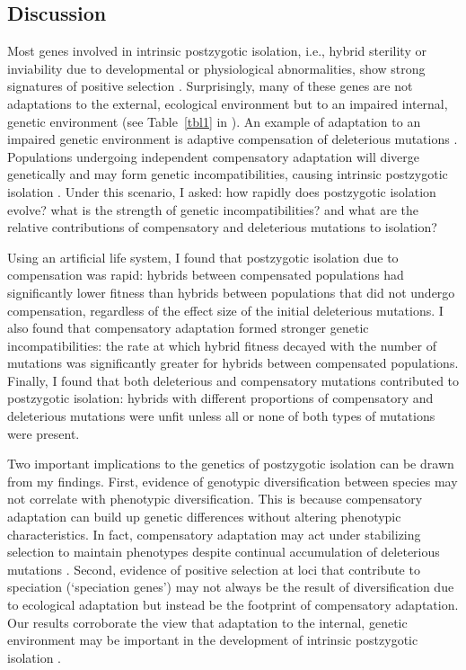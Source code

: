 \begin{doublespace}
\section{Discussion}

Most genes involved in intrinsic postzygotic isolation,
i.e., hybrid sterility or inviability
due to developmental or physiological abnormalities,
show strong signatures of positive selection \citep{pre10}.
%
Surprisingly, many of these genes
are not adaptations to the external, ecological environment
but to an impaired internal, genetic environment
(see Table~\ref{tbl1} in \citep{pre10}).
%
An example of adaptation to an impaired genetic environment
is adaptive compensation of deleterious mutations
\citep{har96,bur99,moo00,lev00,mai02,est03,est11}.
%
Populations undergoing independent compensatory adaptation
will diverge genetically
and may form genetic incompatibilities,
causing intrinsic postzygotic isolation
\citep{orr01,kon02,kul04,coy04,lan07,sch09b,pre10}.
%
Under this scenario, I asked:
how rapidly does postzygotic isolation evolve?
what is the strength of genetic incompatibilities?
and what are the relative contributions
of compensatory and deleterious mutations to isolation?



Using an artificial life system,
I found that postzygotic isolation
due to compensation was rapid:
hybrids between compensated populations
had significantly lower fitness
than hybrids between populations that did not undergo compensation,
regardless of the effect size
of the initial deleterious mutations.
%
I also found that compensatory adaptation
formed stronger genetic incompatibilities:
the rate at which hybrid fitness
decayed with the number of mutations
was significantly greater
for hybrids between compensated populations.
%
Finally, I found that both
deleterious and compensatory mutations
contributed to postzygotic isolation:
hybrids with different proportions
of compensatory and deleterious mutations
were unfit unless all or none
of both types of mutations were present.



Two important implications to the genetics of postzygotic isolation
can be drawn from my findings.
%
First, evidence of genotypic diversification between species
may not correlate with phenotypic diversification.
%
This is because compensatory adaptation can build up genetic differences
without altering phenotypic characteristics.
%
In fact, compensatory adaptation may act under stabilizing selection
to maintain phenotypes despite continual accumulation of
deleterious mutations \citep{har96}.
%
Second, evidence of positive selection
at loci that contribute to speciation (`speciation genes')
may not always be the result of diversification
due to ecological adaptation
but instead be the footprint of compensatory adaptation.
%
Our results corroborate the view that
adaptation to the internal, genetic environment
may be important in the development
of intrinsic postzygotic isolation \citep{pre10,pha09}.




\end{doublespace}
